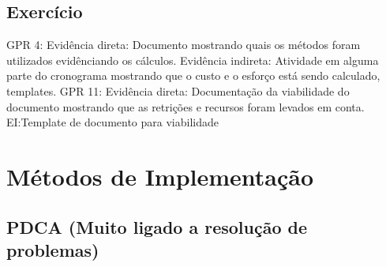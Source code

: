 \documentclass{article}
\begin{document}
\subsection{Exercício}
	GPR 4: 
		Evidência direta: Documento mostrando quais os métodos foram utilizados evidênciando os cálculos.
		Evidência indireta: Atividade em alguma parte do cronograma mostrando que o custo e o esforço está sendo calculado, templates.
	GPR 11:
		Evidência direta: Documentação da viabilidade do documento mostrando que as retrições e recursos foram levados em conta.
		EI:Template de documento para viabilidade
\section{Métodos de Implementação} \date{19/05/2014}
\subsection{PDCA (Muito ligado a resolução de problemas)}
\end{document}

